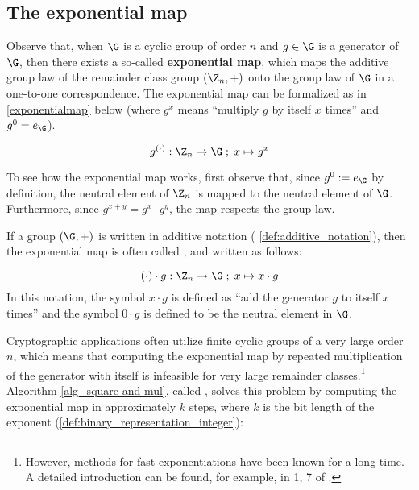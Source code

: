 \subsection{The exponential map}
Observe that, when $\G$ is a cyclic group of order $n$ and $g\in \G$ is a generator of $\G$, then there exists a so-called \textbf{exponential map}, which maps the additive group law of the remainder class group $(\Z_n,+)$ onto the group law of $\G$ in a one-to-one correspondence. The exponential map can be formalized as in \eqref{exponentialmap} below (where $g^x$ means ``multiply $g$ by itself $x$ times'' and $g^0=e_{\G}$).

\begin{equation}\label{exponentialmap}
g^{(\cdot)}: \Z_n \to \G\;;\; x \mapsto g^x
\end{equation}

To see how the exponential map works, first observe that, since $g^0:=e_{\G}$ by definition, the neutral element of $\Z_n$ is mapped to the neutral element of $\G$. Furthermore, since $g^{x+y}=g^x\cdot g^y$, the map respects the group law.

\begin{notation}
\label{def:scalar_multiplication} If a group $(\G,+)$ is written in additive notation (\notationname{} \ref{def:additive_notation}), then the exponential map is often called , and written as follows:

\begin{equation}\label{scalarmultiplication}
(\cdot)\cdot g: \Z_n \to \G\;;\; x \mapsto x\cdot g
\end{equation}
In this notation, the symbol $x\cdot g$  is defined as ``add the generator $g$ to itself $x$ times'' and the symbol $0\cdot g$ is defined to be the neutral element in $\G$.
\end{notation}

Cryptographic applications often utilize finite cyclic groups of a very large order $n$, which means that computing the exponential map by repeated multiplication of the generator with itself is infeasible for very large remainder classes.\footnote{However, methods for fast exponentiations have been known for a long time. A detailed introduction can be found, for example, in \chaptname{} 1, \secname{} 7 of \cite{mignotte-1992}. }
 Algorithm \ref{alg_square-and-mul}, called , solves this problem by computing the exponential map in approximately $k$ steps, where $k$ is the bit length of the exponent (\ref{def:binary_representation_integer}):


